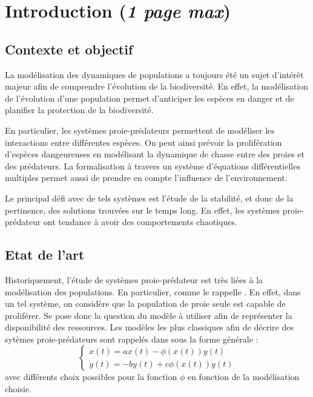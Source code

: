 \chapter{Introduction (\textit{1 page max})}
\label{ch:Introduction}

\section{Contexte et objectif}
\label{sec:Contexte}

La modélisation des dynamiques de populations a toujours été un sujet d'intérêt majeur afin de comprendre l'évolution de la biodiversité. En effet, la modélisation de l'évolution d'une population permet d'anticiper les espèces en danger et de planifier la protection de la biodiversité.

En particulier, les systèmes proie-prédateurs permettent de modéliser les interactions entre différentes espèces. On peut ainsi prévoir la prolifération d'espèces dangeureuses en modélisant la dynamique de chasse entre des proies et des prédateurs. La formalisation à travers un système d'équations différentielles multiples permet aussi de prendre en compte l'influence de l'environnement.

Le principal défi avec de tels systèmes est l'étude de la stabilité, et donc de la pertinence, des solutions trouvées sur le temps long. En effet, les systèmes proie-prédateur ont tendance à avoir des comportements chaotiques.

\section{Etat de l'art}
\label{sec:Etat}

Historiquement, l'étude de systèmes proie-prédateur est très liées à la modélisation des populations. En particulier, comme le rappelle \cite{BrauerBiology}. En effet, dans un tel système, on considère que la population de proie seule est capable de proliférer. Se pose donc la question du modèle à utiliser afin de représenter la disponibilité des ressources.
Les modèles les plus classiques afin de décrire des sytèmes proie-prédateurs sont rappelés dans \cite{Holl2stoch} sous la forme générale :
\begin{equation}
    \begin{cases}
        \dot{x}(t) = a x(t) - \phi (x(t)) y(t) \\
        \dot{y}(t) = -b y(t) + c \phi (x(t)) y(t)
    \end{cases}
\end{equation}
avec différents choix possibles pour la fonction $\phi$ en fonction de la modélisation choisie.

